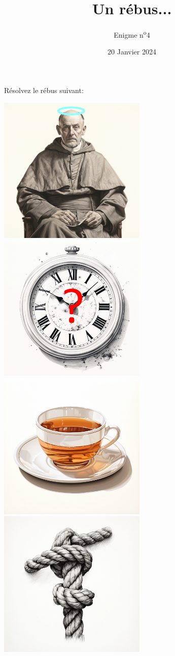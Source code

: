\documentclass[a4paper, top=10mm]{article}
\title{\textbf{\huge{Un rébus...}}}
\author{Enigme n\textsuperscript{o}4}
\date{20 Janvier 2024}
\begin{document}
	\maketitle
	
	\huge
	Résolvez le rébus suivant:
	
	\vspace{1cm}
	
	\begin{center}
		\includegraphics[width=200pt]{04saint.png}
		\includegraphics[width=200pt]{04quand.png}\\
		\vspace{0.2cm}
		\hspace{1cm}
		\includegraphics[width=200pt]{04the.png}
		\includegraphics[width=200pt]{04node.png}
	\end{center}
	
\end{document}
